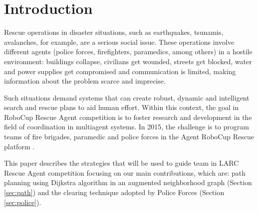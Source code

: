 \section{Introduction}
\label{sec:intro}

Rescue operations in disaster situations, such as earthquakes, tsunamis, avalanches, for example, are a serious social issue. These operations involve different agents (police forces, firefighters, paramedics, among others) in a hostile environment: buildings collapse, civilians get wounded, streets get blocked, water and power supplies get compromised and communication is limited, making information about the problem scarce and imprecise.

Such situations demand systems that can create robust, dynamic and intelligent search and rescue plans to aid human effort. Within this context, the goal in RoboCup Rescue Agent competition is to foster research and development in the field of coordination in multiagent systems. In 2015, the challenge is to program teams of fire brigades, paramedic and police forces in the Agent RoboCup Rescue platform \cite{Kitano2000}.%


This paper describes the strategies that will be used to guide \teamname team in  LARC Rescue Agent competition focusing on our main contributions, which are: path planning using Dijkstra algorithm in an augmented neighborhood graph (Section \ref{sec:path}) and the clearing technique adopted by Police Forces (Section \ref{sec:police}). %
